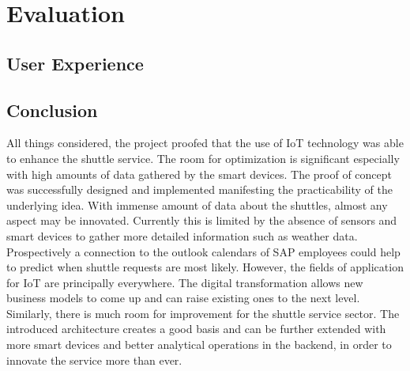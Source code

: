 \chapter{Evaluation}
\section{User Experience}


\section{Conclusion}
All things considered, the project proofed that the use of IoT technology was
able to enhance the shuttle service. The room for optimization is significant
especially with high amounts of data gathered by the smart devices.
\newline The proof of concept was successfully designed and implemented
manifesting the practicability of the underlying idea. With immense amount of
data about the shuttles, almost any aspect may be innovated. \newline Currently
this is limited by the absence of sensors and smart devices to gather more
detailed information such as weather data. Prospectively a connection to the
outlook calendars of SAP employees could help to predict when shuttle requests
are most likely. \newline However, the fields of application for IoT are principally
everywhere. The digital transformation allows new business models to come up and
can raise existing ones to the next level. Similarly, there is much room for
improvement for the shuttle service sector. The introduced architecture creates
a good basis and can be further extended with more smart devices and better
analytical operations in the backend, in order to innovate the service more than
ever. 
